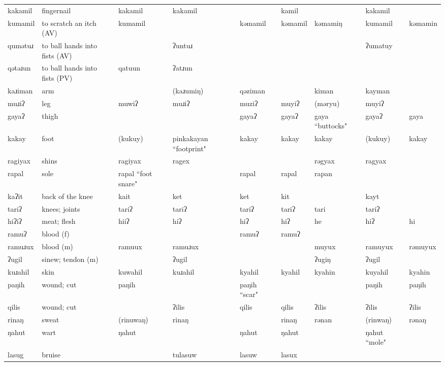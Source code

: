 \begin{landscape}
\begin{longtable}{*{9}{p{}}}
\text{*}kakamil & fingernail & kakamil & kakamil &  & kamil &  & kakamil & \\
\text{*}kumamil & to scratch an itch (AV) & kumamil &  & kəmamil & kəmamil & kəmamiŋ & kumamil & kəmamin\\
\text{*}qumətuɹ & to ball hands into fists (AV) &  & ʔuntuɹ &  &  &  & ʔumatuy & \\
\text{*}qətəɹun & to ball hands into fists (PV) & qatuun & ʔatɹun &  &  &  &  & \\
\text{*}kaɹiman & arm &  & (kaɹumiŋ) & qəziman &  & kiman & kayman & \\
\text{*}muɹiʔ & leg & muwiʔ & muɹiʔ & muziʔ & muyiʔ & (məryu) & muyiʔ & \\
\text{*}gayaʔ & thigh &  &  & gayaʔ & gayaʔ & gaya ``buttocks" & gayaʔ & gaya\\
\text{*}kakay & foot & (kukuy) & pinkakayan ``footprint" & kakay & kakay & kakay & (kukuy) & kakay\\
\text{*}ragiyax & shins & ragiyax & ragex &  &  & rəgyax & ragyax & \\
\text{*}rapal & sole & rapal ``foot snare" &  & rapal & rapal & rapan &  & \\
\text{*}kaʔit & back of the knee & kait & ket & ket & kit &  & kayt & \\
\text{*}tariʔ & knees; joints & tariʔ & tariʔ & tariʔ & tariʔ & tari & tariʔ & \\
\text{*}hiʔiʔ & meat; flesh & hiiʔ & hiʔ & hiʔ & hiʔ & he & hiʔ & hi\\
\text{*}ramuʔ & blood (f) &  &  & ramuʔ & ramuʔ &  &  & \\
\text{*}ramuɹux & blood (m) & ramuux & ramuɹux &  &  & muyux & ramuyux & rəmuyux\\
\text{*}ʔugil & sinew; tendon (m) &  & ʔugil &  &  & ʔugiŋ & ʔugil & \\
\text{*}kuɹahil & skin & kuwahil & kuɹahil & kyahil & kyahil & kyahin & kuyahil & kyahin\\
\text{*}paŋih & wound; cut & paŋih &  & paŋih ``scar" &  &  & paŋih & paŋih\\
\text{*}qilis & wound; cut &  & ʔilis & qilis & qilis & ʔilis & ʔilis & ʔilis\\
\text{*}rinaŋ & sweat & (rinuwaŋ) & rinaŋ &  & rinaŋ & rənan & (rinwaŋ) & rənaŋ\\
\text{*}ŋahut & wart & ŋahut &  & ŋahut & ŋahut &  & ŋahut ``mole" & \\
\text{*}lasug & bruise &  & tulasuw & lasuw & lasux &  &  & \\

\end{longtable}
\end{landscape}
